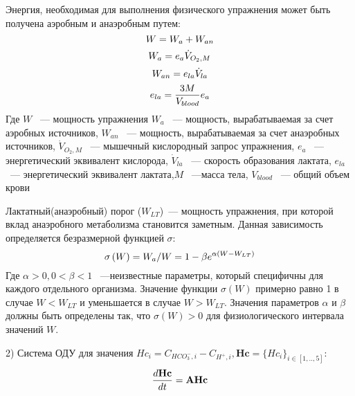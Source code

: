 Энергия, необходимая для выполнения физического упражнения может быть получена аэробным и анаэробным путем: 
\begin{equation}\label{eq:W}
W=W_{a}+W_{an} \notag
\end{equation}
\begin{equation}\label{eq:Wa}
W_{a}=e_{a}\dot{V}_{O_{2},M} \notag
\end{equation}
\begin{equation}\label{eq:Wan}
W_{an}=e_{la}\dot{V}_{la}\notag
\end{equation}
\begin{equation} \label{eq:a_la_eqviv}
e_{la}=\frac{3M}{V_{blood}}e_{a} \notag
\end{equation}
Где \( W \) ~--- мощность упражнения \( W_{a} \) ~--- мощность, вырабатываемая за счет аэробных источников,  \( W_{an} \) ~--- мощность, вырабатываемая за счет анаэробных источников, \( \dot{V}_{O_{2},M} \) ~--- мышечный кислородный запрос упражнения, \(e_{a}\) ~--- энергетический эквивалент кислорода, \( \dot{V}_{la} \) ~--- скорость образования лактата, \(e_{la}\) ~--- энергетический эквивалент лактата,\( M \)  ~---масса тела, \(V_{blood}\) ~--- общий объем крови

Лактатный(анаэробный) порог ($W_{LT}$)~--- мощность упражнения, при которой вклад анаэробного метаболизма становится заметным. Данная зависимость определяется безразмерной функцией $\sigma$:
\begin{equation} \label{eq:sigma}
\sigma\left(W\right) = W_{a} / W = 1-\beta e^{\alpha(W-W_{LT})} \notag
\end{equation}
Где $\alpha > 0, 0 < \beta < 1$  ~---неизвестные параметры, который специфичны для каждого отдельного организма. Значение функции $\sigma\left(W\right)$ примерно равно 1 в случае $W < W_{LT}$ и уменьшается в случае $W > W_{LT}$. Значения параметров $\alpha$ и $\beta$ должны быть определены так, что $\sigma\left(W\right) > 0$ для физиологического интервала значений $W$.

2) Система ОДУ для значения $Hc_{i}=C_{HCO_{3}^{-},i}-C_{H^{+},i}, \mathbf{Hc} = \{ Hc_i \}_{i \in [1,..,5]}$:
\begin{equation}
\frac{d \textbf{Hc}}{dt}= \mathbf{A Hc} \notag
\end{equation}

